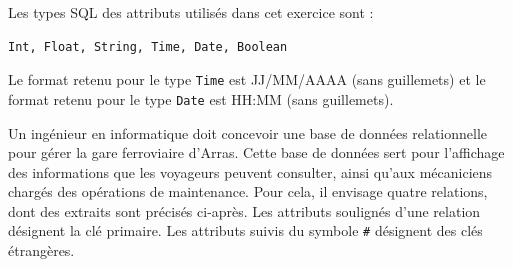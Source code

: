 \documentclass[11pt,a4paper,french,twoside]{PMCours}
\begin{document}
\medskip
Les types SQL des attributs utilisés dans cet exercice sont : 
\begin{verbatim}
Int, Float, String, Time, Date, Boolean
\end{verbatim} 
Le format retenu pour le type \verb'Time' est JJ/MM/AAAA (sans guillemets) et 
le format retenu pour le type \verb'Date' est HH:MM (sans guillemets).

\medskip
Un ingénieur en informatique doit concevoir une base de données relationnelle pour gérer la gare ferroviaire d'Arras. Cette base de données sert pour l'affichage des informations  que les voyageurs peuvent consulter, ainsi qu'aux mécaniciens chargés des opérations de maintenance. Pour cela, il envisage quatre relations, dont des extraits sont précisés ci-après. Les attributs soulignés d'une relation désignent la clé primaire. Les attributs suivis du symbole \verb'#' désignent des clés étrangères.
\end{document}
